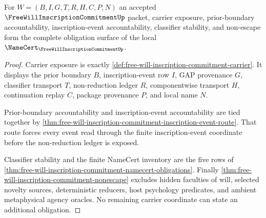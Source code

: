 \begin{theorem}
\label{thm:free-will-inscription-commitment-obligation-closure}
For $W=(B,I,G,T,R,H,C,P,N)$ an accepted $\FreeWillInscriptionCommitmentUp$ packet, carrier exposure, prior-boundary accountability, inscription-event accountability, classifier stability, and non-escape form the complete obligation surface of the local $\NameCert_{\FreeWillInscriptionCommitmentUp}$.
\end{theorem}
\begin{proof}
Carrier exposure is exactly \autoref{def:free-will-inscription-commitment-carrier}. It displays the prior boundary $B$, inscription-event row $I$, GAP provenance $G$, classifier transport $T$, non-reduction ledger $R$, componentwise transport $H$, continuation replay $C$, package provenance $P$, and local name $N$.

Prior-boundary accountability and inscription-event accountability are tied together by \autoref{thm:free-will-inscription-commitment-inscription-event-route}. That route forces every event read through the finite inscription-event coordinate before the non-reduction ledger is exposed.

Classifier stability and the finite NameCert inventory are the five rows of \autoref{thm:free-will-inscription-commitment-namecert-obligations}. Finally \autoref{thm:free-will-inscription-commitment-nonescape} excludes hidden faculties of will, selected novelty sources, deterministic reducers, host psychology predicates, and ambient metaphysical agency oracles. No remaining carrier coordinate can state an additional obligation.
\end{proof}


\begin{closurestatus}{\FreeWillInscriptionCommitmentUp}
  \theoryclosure{\obligationClosure}
  \formalstatus{\unformalizedV}
\end{closurestatus}
